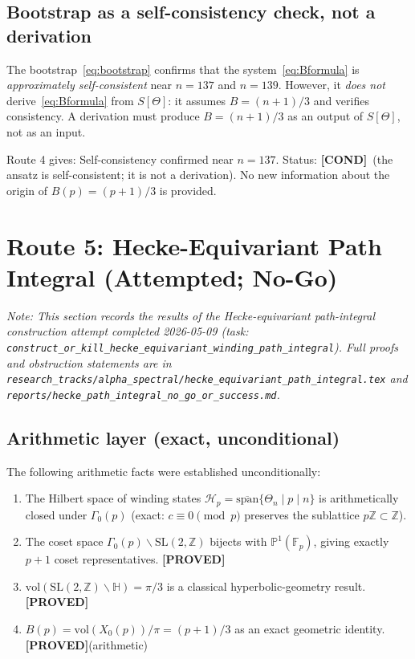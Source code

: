 \documentclass[12pt,a4paper]{article}
\theoremstyle{definition}
\theoremstyle{remark}
\newcommand{\proved}{\textcolor{green!55!black}{\textbf{[PROVED]}}}
\newcommand{\cond}{\textcolor{blue!70!black}{\textbf{[COND]}}}
\begin{document}
\subsection{Bootstrap as a self-consistency check, not a derivation}

The bootstrap~\eqref{eq:bootstrap} confirms that the system~\eqref{eq:Bformula} is
\emph{approximately self-consistent} near $n = 137$ and $n = 139$.  However,
it \emph{does not} derive~\eqref{eq:Bformula} from $S[\Theta]$: it assumes
$B = (n+1)/3$ and verifies consistency.  A derivation must produce
$B = (n+1)/3$ as an output of $S[\Theta]$, not as an input.

\begin{resultbox}
Route 4 gives: Self-consistency confirmed near $n = 137$.
Status: \cond\ (the ansatz is self-consistent; it is not a derivation).
No new information about the origin of $B(p) = (p+1)/3$ is provided.
\end{resultbox}

\section{Route 5: Hecke-Equivariant Path Integral (Attempted; No-Go)}
\label{sec:hecke}

\textit{Note: This section records the results of the Hecke-equivariant
path-integral construction attempt completed 2026-05-09
(task: \texttt{construct\_or\_kill\_hecke\_equivariant\_winding\_path\_integral}).
Full proofs and obstruction statements are in
\texttt{research\_tracks/alpha\_spectral/hecke\_equivariant\_path\_integral.tex}
and \texttt{reports/hecke\_path\_integral\_no\_go\_or\_success.md}.}

\subsection{Arithmetic layer (exact, unconditional)}

The following arithmetic facts were established unconditionally:

\begin{enumerate}
  \item The Hilbert space of winding states $\mathcal{H}_p = \overline{\mathrm{span}}\{\Theta_n \mid p \mid n\}$
        is arithmetically closed under $\Gamma_0(p)$ (exact: $c \equiv 0 \pmod{p}$
        preserves the sublattice $p\mathbb{Z} \subset \mathbb{Z}$).
  \item The coset space $\Gamma_0(p)\backslash\mathrm{SL}(2,\mathbb{Z})$ bijects
        with $\mathbb{P}^1(\mathbb{F}_p)$, giving exactly $p+1$ coset representatives.
        \proved
  \item $\mathrm{vol}(\mathrm{SL}(2,\mathbb{Z})\backslash\mathbb{H}) = \pi/3$
        is a classical hyperbolic-geometry result.  \proved
  \item $B(p) = \mathrm{vol}(X_0(p))/\pi = (p+1)/3$ as an exact geometric identity.
        \proved (arithmetic)
\end{enumerate}
\end{document}
